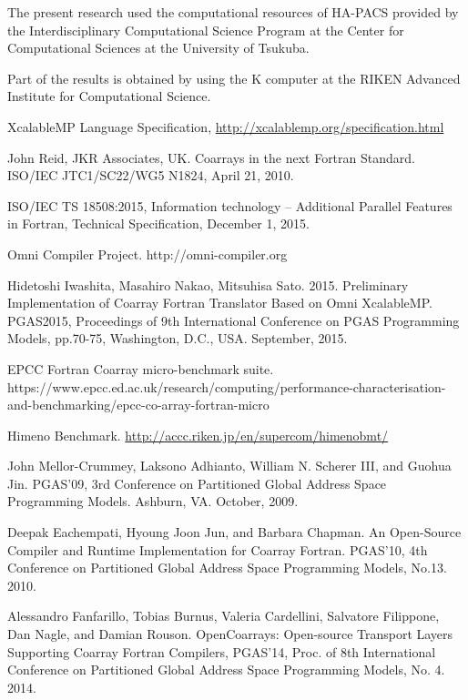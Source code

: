\documentclass[graybox]{svmult}
\begin{document}
The present research used the computational resources of HA-PACS provided by the 
Interdisciplinary Computational Science Program at the Center for 
Computational Sciences at the University of Tsukuba. 

Part of the results is obtained by using the K computer at the RIKEN Advanced 
Institute for Computational Science. %


\begin{thebibliography}{99}

XcalableMP Language Specification, \url{http://xcalablemp.org/specification.html}

John Reid, JKR Associates, UK. Coarrays in the next Fortran Standard.
ISO/IEC JTC1/SC22/WG5 N1824, April 21, 2010.

 ISO/IEC TS 18508:2015, Information technology -- 
Additional Parallel Features in Fortran, Technical Specification, December 1, 2015.

Omni Compiler Project. http://omni-compiler.org

Hidetoshi Iwashita, Masahiro Nakao, Mitsuhisa Sato. 2015. Preliminary Implementation 
of Coarray Fortran Translator Based on Omni XcalableMP. PGAS2015, Proceedings of 9th 
International Conference on PGAS Programming Models, pp.70-75, Washington, D.C., USA.
September, 2015.

 EPCC Fortran Coarray micro-benchmark suite.\\
https://www.epcc.ed.ac.uk/research/computing/performance-characterisation-and-benchmarking/epcc-co-array-fortran-micro

Himeno Benchmark. \url{http://accc.riken.jp/en/supercom/himenobmt/}

John Mellor-Crummey, Laksono Adhianto, William N. Scherer III, and Guohua Jin. 
PGAS’09, 3rd Conference on Partitioned Global Address Space Programming Models. 
Ashburn, VA. October, 2009.

Deepak Eachempati, Hyoung Joon Jun, and Barbara Chapman. 
An Open-Source Compiler and Runtime Implementation for Coarray Fortran. 
PGAS’10, 4th Conference on Partitioned Global Address Space Programming Models, 
No.13. 2010.

Alessandro Fanfarillo, Tobias Burnus, Valeria Cardellini, Salvatore Filippone, 
Dan Nagle, and Damian Rouson. OpenCoarrays: Open-source Transport Layers 
Supporting Coarray Fortran Compilers, PGAS'14, Proc. of 8th International 
Conference on Partitioned Global Address Space Programming Models, No. 4. 2014.



\end{thebibliography}
\end{document}
